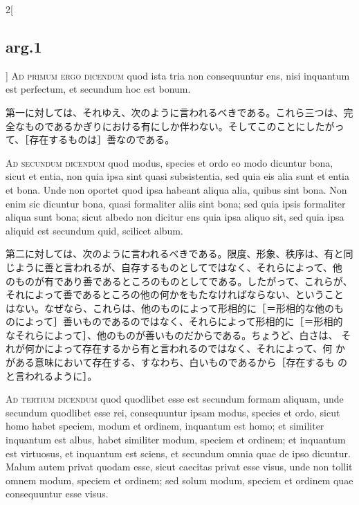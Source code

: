 \documentclass[paper=a4paper,fontsize=10pt,jafontsize=9pt,titlepage]{jlreq}
\begin{document}
\begin{paracol}{2}[\subsection{arg.1}]
{\scshape Ad primum ergo dicendum} quod ista tria non consequuntur ens, nisi
 inquantum est perfectum, et secundum hoc est bonum.

\switchcolumn

第一に対しては、それゆえ、次のように言われるべきである。これら三つは、完
 全なものであるかぎりにおける有にしか伴わない。そしてこのことにしたがっ
 て、［存在するものは］善なのである。

\switchcolumn*[\subsection{ad.2}]

{\scshape Ad secundum dicendum} quod modus, species et ordo eo modo dicuntur
 bona, sicut et entia, non quia ipsa sint quasi subsistentia, sed quia
 eis alia sunt et entia et bona. Unde non oportet quod ipsa habeant
 aliqua alia, quibus sint bona. Non enim sic dicuntur bona, quasi
 formaliter aliis sint bona; sed quia ipsis formaliter aliqua sunt bona;
 sicut albedo non dicitur ens quia ipsa aliquo sit, sed quia ipsa
 aliquid est secundum quid, scilicet album.

\switchcolumn

第二に対しては、次のように言われるべきである。限度、形象、秩序は、有と同
 じように善と言われるが、自存するものとしてではなく、それらによって、他
 のものが有であり善であるところのものとしてである。したがって、これらが、
 それによって善であるところの他の何かをもたなければならない、ということ
 はない。なぜなら、これらは、他のものによって形相的に［＝形相的な他のも
 のによって］善いものであるのではなく、それらによって形相的に［＝形相的
 なそれらによって］、他のものが善いものだからである。ちょうど、白さは、
 それが何かによって存在するから有と言われるのではなく、それによって、何
 かがある意味において存在する、すなわち、白いものであるから［存在するも
 のと言われるように］。

\switchcolumn*[\subsection{ad.3}]

{\scshape Ad tertium dicendum} quod quodlibet esse est secundum formam
 aliquam, unde secundum quodlibet esse rei, consequuntur ipsam modus,
 species et ordo, sicut homo habet speciem, modum et ordinem, inquantum
 est homo; et similiter inquantum est albus, habet similiter modum,
 speciem et ordinem; et inquantum est virtuosus, et inquantum est
 sciens, et secundum omnia quae de ipso dicuntur. Malum autem privat
 quodam esse, sicut caecitas privat esse visus, unde non tollit omnem
 modum, speciem et ordinem; sed solum modum, speciem et ordinem quae
 consequuntur esse visus.


\end{paracol}
\end{document}
